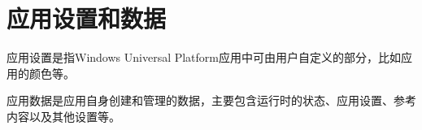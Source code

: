 \chapter{应用设置和数据}

应用设置是指Windows Universal Platform应用中可由用户自定义的部分，比如应用的颜色等。

应用数据是应用自身创建和管理的数据，主要包含运行时的状态、应用设置、参考内容以及其他设置等。